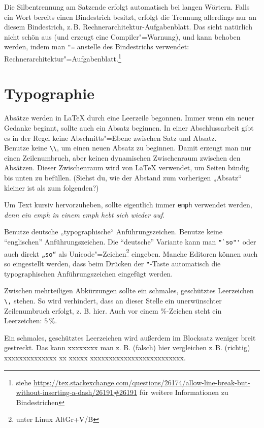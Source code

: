 Die Silbentrennung am Satzende erfolgt automatisch bei langen Wörtern.
Falls ein Wort bereits einen Bindestrich besitzt, erfolgt die Trennung allerdings nur an diesem Bindestrich, z.\,B. Rechnerarchitektur-Aufgabenblatt.
Das sieht natürlich nicht schön aus (und erzeugt eine Compiler"=Warnung), und kann behoben werden, indem man \verb|"=| anstelle des Bindestrichs verwendet: Rechnerarchitektur"=Aufgabenblatt.\footnote{siehe \url{https://tex.stackexchange.com/questions/26174/allow-line-break-but-without-inserting-a-dash/26191\#26191} für weitere Informationen zu Bindestrichen}

\section{Typographie}

Absätze werden in \LaTeX{} durch eine Leerzeile begonnen.
Immer wenn ein neuer Gedanke beginnt, sollte auch ein Absatz beginnen.
In einer Abschlussarbeit gibt es in der Regel keine Abschnitts"=Ebene zwischen Satz und Absatz.\\
Benutze keine \verb|\\|, um einen neuen Absatz zu beginnen.
Damit erzeugt man nur einen Zeilenumbruch, aber keinen dynamischen Zwischenraum zwischen den Absätzen.
Dieser Zwischenraum wird von \LaTeX{} verwendet, um Seiten bündig bis unten zu befüllen.
(Siehst du, wie der Abstand zum vorherigen „Absatz“ kleiner ist als zum folgenden?)

Um Text kursiv hervorzuheben, sollte eigentlich immer \verb|emph| verwendet werden, \emph{denn ein emph \emph{in einem emph} hebt sich wieder auf}.

Benutze deutsche „typographische“ Anführungszeichen.
Benutze keine ``englischen'' Anführungszeichen.
Die "`deutsche"' Variante kann man \verb|"`so"'| oder auch direkt \verb|„so“| als Unicode"=Zeichen\footnote{unter Linux AltGr+V/B} eingeben.
Manche Editoren können auch so eingestellt werden, dass beim Drücken der \verb|"|-Taste automatisch die typographischen Anführungszeichen eingefügt werden.

Zwischen mehrteiligen Abkürzungen sollte ein schmales, geschütztes Leerzeichen \verb|\,| stehen. So wird verhindert, dass an dieser Stelle ein unerwünschter Zeilenumbruch erfolgt, z. B. hier.
Auch vor einem \%-Zeichen steht ein Leerzeichen: $5\,\%$.

Ein schmales, geschütztes Leerzeichen wird außerdem im Blocksatz weniger breit gestreckt. Das kann xxxxxxxx man z. B. (falsch) hier vergleichen z.\,B. (richtig) xxxxxxxxxxxxxx xx xxxxx xxxxxxxxxxxxxxxxxxxxxxxxx.

